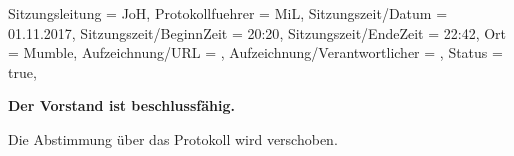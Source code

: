 
\begin{Protokoll}{
        Sitzungsleitung                 = {JoH}, 			%
        Protokollfuehrer                = {MiL},  			%
        Sitzungszeit/Datum              = {01.11.2017},   	%
        Sitzungszeit/BeginnZeit         = {20:20},			%
        Sitzungszeit/EndeZeit           = {22:42},			%
        Ort                             = {Mumble},			%
        Aufzeichnung/URL                = {},				%
        Aufzeichnung/Verantwortlicher   = {},		  	    %
        Status                          = {true},			%
    }
    
    \begin{Anwesenheitsliste}
    \end{Anwesenheitsliste}
    
	\textbf{Der Vorstand ist beschlussfähig.}
    
    Die Abstimmung über das Protokoll wird verschoben.
    

\end{Protokoll}
